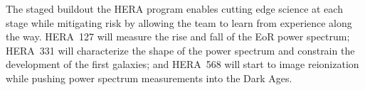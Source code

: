 \documentclass[preprint]{aastex}
\begin{document}


\noindent
The staged buildout the HERA program enables cutting edge science at each stage while mitigating risk by allowing the team to learn from experience along the way. HERA~127 will measure the rise and fall of the EoR power spectrum; HERA~331 will characterize the shape of the power spectrum and constrain the development of the first galaxies; and HERA~568 will start to image reionization while pushing power spectrum measurements into the Dark Ages.
\end{document}
